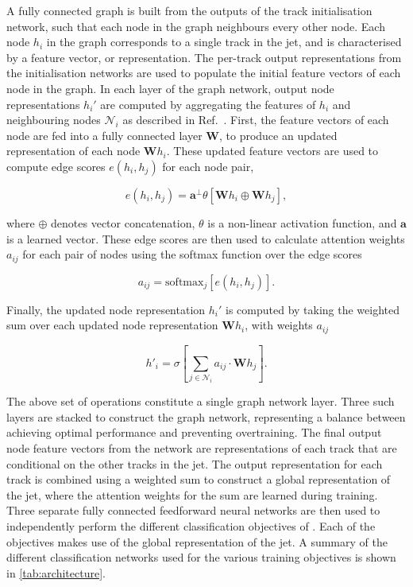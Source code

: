 A fully connected graph is built from the outputs of the track initialisation network, such that each node in the graph neighbours every other node.
Each node $h_i$ in the graph corresponds to a single track in the jet, and is characterised by a feature vector, or representation.
The per-track output representations from the initialisation networks are used to populate the initial feature vectors of each node in the graph.
In each layer of the graph network, output node representations $h_i'$ are computed by aggregating the features of $h_i$ and neighbouring nodes $\mathcal{N}_i$ as described in Ref.~\cite{2021arXiv210514491B}.
First, the feature vectors of each node are fed into a fully connected layer $\mathbf{W}$, to produce an updated representation of each node $\mathbf{W} h_i$.
These updated feature vectors are used to compute edge scores $e(h_i, h_j)$ for each node pair,

\begin{equation}\label{eq:edge_score}
    e(h_i, h_j) = \mathbf{a}^\perp \theta \left[ \mathbf{W}h_i \oplus \mathbf{W}h_j \right],
\end{equation}

where $\oplus$ denotes vector concatenation, $\theta$ is a non-linear activation function, and $\mathbf{a}$ is a learned vector.
These edge scores are then used to calculate attention weights $a_{ij}$ for each pair of nodes using the softmax function over the edge scores

\begin{equation}\label{eq:attention weights}
    a_{ij} = \mathrm{softmax}_j \left[ e(h_i, h_j) \right].
\end{equation}

Finally, the updated node representation $h_i'$ is computed by taking the weighted sum over each updated node representation $\mathbf{W} h_i$, with weights $a_{ij}$

\begin{equation}\label{eq:updated_node_rep}
    h'_i = \sigma \left[ \sum_{j \in \mathcal{N}_i}{a_{ij} \cdot \mathbf{W} {h}_j}  \right].
\end{equation}

The above set of operations constitute a single graph network layer. 
Three such layers are stacked to construct the graph network, representing a balance between achieving optimal performance and preventing overtraining.
The final output node feature vectors from the network are representations of each track that are conditional on the other tracks in the jet.
The output representation for each track is combined using a weighted sum to construct a global representation of the jet, where the attention weights for the sum are learned during training.
Three separate fully connected feedforward neural networks are then used to independently perform the different classification objectives of \GNN.
Each of the objectives makes use of the global representation of the jet.
A summary of the different classification networks used for the various training objectives is shown in \cref{tab:architecture}.

